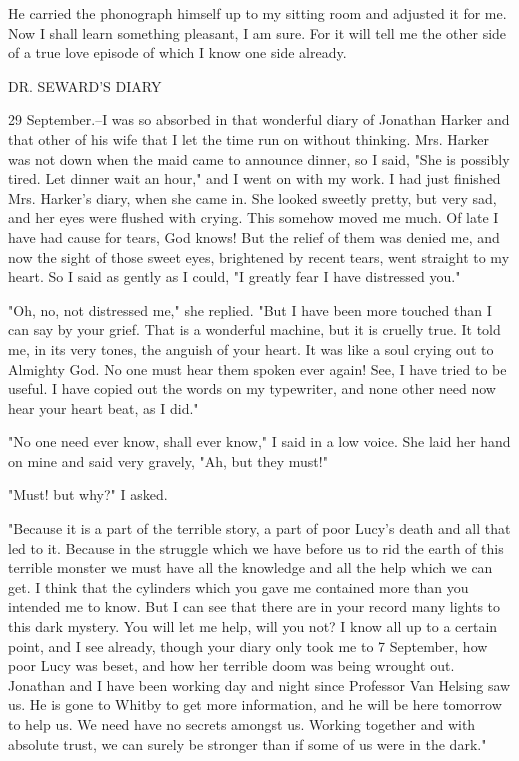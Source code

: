 He carried the phonograph himself up to my sitting room and adjusted it for me. Now I shall learn something pleasant, I am sure. For it will tell me the other side of a true love episode of which I know one side already. 

DR. SEWARD'S DIARY 

29 September.--I was so absorbed in that wonderful diary of Jonathan Harker and that other of his wife that I let the time run on without thinking. Mrs. Harker was not down when the maid came to announce dinner, so I said, "She is possibly tired. Let dinner wait an hour," and I went on with my work. I had just finished Mrs. Harker's diary, when she came in. She looked sweetly pretty, but very sad, and her eyes were flushed with crying. This somehow moved me much. Of late I have had cause for tears, God knows! But the relief of them was denied me, and now the sight of those sweet eyes, brightened by recent tears, went straight to my heart. So I said as gently as I could, "I greatly fear I have distressed you." 

"Oh, no, not distressed me," she replied. "But I have been more touched than I can say by your grief. That is a wonderful machine, but it is cruelly true. It told me, in its very tones, the anguish of your heart. It was like a soul crying out to Almighty God. No one must hear them spoken ever again! See, I have tried to be useful. I have copied out the words on my typewriter, and none other need now hear your heart beat, as I did." 

"No one need ever know, shall ever know," I said in a low voice. She laid her hand on mine and said very gravely, "Ah, but they must!" 

"Must! but why?" I asked. 

"Because it is a part of the terrible story, a part of poor Lucy's death and all that led to it. Because in the struggle which we have before us to rid the earth of this terrible monster we must have all the knowledge and all the help which we can get. I think that the cylinders which you gave me contained more than you intended me to know. But I can see that there are in your record many lights to this dark mystery. You will let me help, will you not? I know all up to a certain point, and I see already, though your diary only took me to 7 September, how poor Lucy was beset, and how her terrible doom was being wrought out. Jonathan and I have been working day and night since Professor Van Helsing saw us. He is gone to Whitby to get more information, and he will be here tomorrow to help us. We need have no secrets amongst us. Working together and with absolute trust, we can surely be stronger than if some of us were in the dark." 

